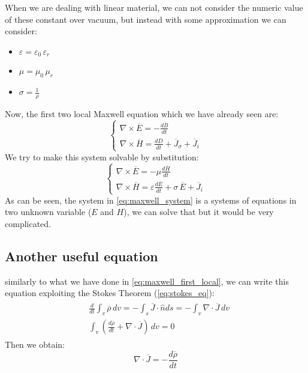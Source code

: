 When we are dealing with linear material, we can not consider the numeric value of these constant over vacuum, but instead with some approximation we can consider:
\begin{itemize}
    \item $\varepsilon=\varepsilon_0\,\varepsilon_r$
    \item $\mu=\mu_0\,\mu_r$
    \item $\sigma=\frac{1}{\rho}$
\end{itemize}
Now, the first two local Maxwell equation which we have already seen are:
\begin{equation}\label{eq:maxwell_system_2}
    \begin{cases}
    \nabla\times\overline{E}=-\frac{d\overline{B}}{dt}\\[5pt]
    \nabla\times\overline{H}=\frac{d\overline{D}}{dt}+\overline{J}_\sigma +\overline{J}_i
    \end{cases}
\end{equation}
We try to make this system solvable by substitution:
\begin{equation}\label{eq:maxwell_system}
    \begin{cases}
    \nabla\times\overline{E}=-\mu\frac{d\overline{H}}{dt}\\[5pt]
    \nabla\times\overline{H}=\varepsilon\frac{d\overline{E}}{dt}+\sigma\,\overline{E}+\overline{J}_i
    \end{cases}
\end{equation}
As can be seen, the system in \cref{eq:maxwell_system} is a systems of equations in two unknown variable ($E$ and $H$), we can solve that but it would be very complicated.
\subsection*{Another useful equation}
similarly to what we have done in \cref{eq:maxwell_first_local}, we can write this equation exploiting the Stokes Theorem (\cref{eq:stokes_eq}):
    \begin{align}
    \begin{split}
    &\frac{d}{dt}\int_v\overline{\rho}\,dv=-\int_s \overline{J}\cdot \hat{n}ds=-\int_v\nabla\cdot\overline{J}\,dv\\[5pt]
    &\int_v\left(\frac{d\overline{\rho}}{dt}+\nabla\cdot\overline{J}\right)\,dv=0
    \end{split}
    \end{align}
Then we obtain:
\begin{equation}
    \nabla\cdot\overline{J}=-\frac{d\overline{\rho}}{dt}
\end{equation}
